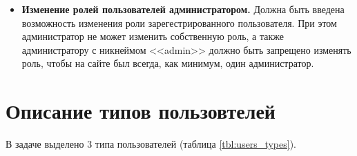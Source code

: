 \begin{itemize}
    \item \textbf{Изменение ролей пользователей администратором.} Должна быть введена возможность изменения роли зарегестрированного пользователя. При этом администратор не может изменить собственную роль, а также администратору с никнеймом <<admin>> должно быть запрещено изменять роль, чтобы на сайте был всегда, как минимум, один администратор.
\end{itemize}


\section{Описание типов пользовтелей}

В задаче выделено 3 типа пользователей (таблица \ref{tbl:users_types}). 

\captionsetup{justification=raggedleft,singlelinecheck=off}
